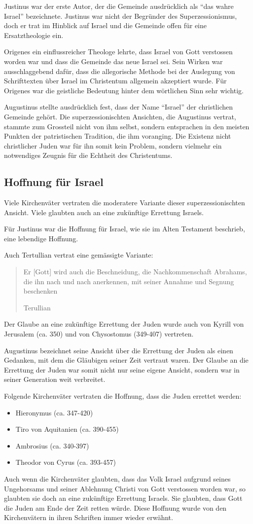 \documentclass[fontsize=14pt]{../../inc/mybib}
\newcommand{\sz}{Superzessionismus}
\begin{document}
    Justinus war der erste Autor, der die Gemeinde ausdrücklich als \enquote{das wahre Israel} bezeichnete. Justinus war nicht der Begründer des \sz, doch er trat im Hinblick auf Israel und die Gemeinde offen für eine Ersatztheologie ein.

    Origenes ein einflussreicher Theologe lehrte, dass Israel von Gott verstossen worden war und dass die Gemeinde das neue Israel sei. Sein Wirken war ausschlaggebend dafür, dass die allegorische Methode bei der Auslegung von Schrifttexten über Israel im Christentum allgemein akzeptiert wurde. Für Origenes war die geistliche Bedeutung hinter dem wörtlichen Sinn sehr wichtig.

    Augustinus stellte ausdrücklich fest, dass der Name \enquote{Israel} der christlichen Gemeinde gehört. Die superzessionischten Ansichten, die Augustinus vertrat, stammte zum Grossteil nicht von ihm selbst, sondern entsprachen in den meisten Punkten der patristischen Tradition, die ihm voranging. Die Existenz nicht christlicher Juden war für ihn somit kein Problem, sondern vielmehr ein notwendiges Zeugnis für die Echtheit des Christentums.

    \subsection{Hoffnung für Israel}
    Viele Kirchenväter vertraten die moderatere Variante dieser superzessionischten Ansicht. Viele glaubten auch an eine zukünftige Errettung Israels.

    Für Justinus war die Hoffnung für Israel, wie sie im Alten Testament beschrieb, eine lebendige Hoffnung.

    Auch Tertullian vertrat eine gemässigte Variante:
    \blockquote[Terullian]{Er [Gott] wird auch die Beschneidung, die Nachkommenschaft Abrahams, die ihn nach und nach anerkennen, mit seiner Annahme und Segnung beschenken}

    Der Glaube an eine zukünftige Errettung der Juden wurde auch von Kyrill von Jerusalem (ca. 350) und von Chysostomus (349-407) vertreten. 

    Augustinus bezeichnet seine Ansicht über die Errettung der Juden als einen Gedanken, mit dem die Gläubigen seiner Zeit vertraut waren. Der Glaube an die Errettung der Juden war somit nicht nur seine eigene Ansicht, sondern war in seiner Generation weit verbreitet.

    Folgende Kirchenväter vertraten die Hoffnung, dass die Juden errettet werden:
    \begin{itemize}
        \item Hieronymus (ca. 347-420)
        \item Tiro von Aquitanien (ca. 390-455)
        \item Ambrosius (ca. 340-397)
        \item Theodor von Cyrus (ca. 393-457)
    \end{itemize}
    Auch wenn die Kirchenväter glaubten, dass das Volk Israel aufgrund seines Ungehorsams und seiner Ablehnung Christi von Gott verstossen worden war, so glaubten sie doch an eine zukünftige Errettung Israels. Sie glaubten, dass Gott die Juden am Ende der Zeit retten würde. Diese Hoffnung wurde von den Kirchenvätern in ihren Schriften immer wieder erwähnt.
\end{document}
